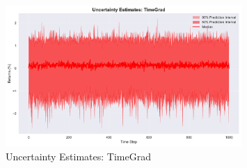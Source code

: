 \begin{figure}[htbp]
\centering
\includegraphics[width=0.8\textwidth]{figures/uncertainty_timegrad.pdf}
\caption{Uncertainty Estimates: TimeGrad}
\label{fig:uncertaintytimegrad}
\end{figure}